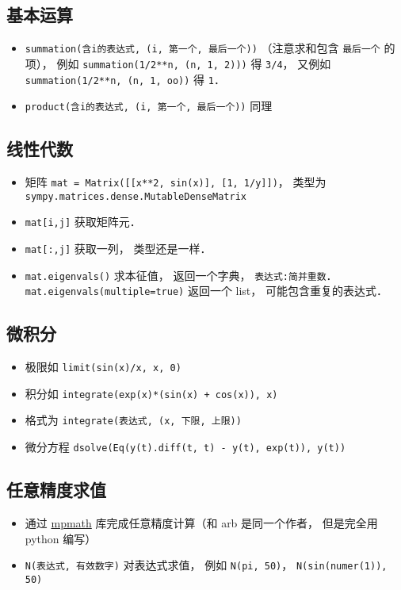 \subsection{基本运算}
\begin{itemize}
\item \verb|summation(含i的表达式, (i, 第一个, 最后一个))| （注意求和包含 \verb|最后一个| 的项）， 例如 \verb|summation(1/2**n, (n, 1, 2)))| 得 \verb|3/4|， 又例如 \verb|summation(1/2**n, (n, 1, oo))| 得 \verb|1|．
\item \verb|product(含i的表达式, (i, 第一个, 最后一个))| 同理
\end{itemize}

\subsection{线性代数}
\begin{itemize}
\item 矩阵 \verb|mat = Matrix([[x**2, sin(x)], [1, 1/y]])|， 类型为 \verb|sympy.matrices.dense.MutableDenseMatrix|
\item \verb|mat[i,j]| 获取矩阵元．
\item \verb|mat[:,j]| 获取一列， 类型还是一样．
\item \verb|mat.eigenvals()| 求本征值， 返回一个字典， \verb|表达式:简并重数|． \verb|mat.eigenvals(multiple=true)| 返回一个 list， 可能包含重复的表达式．
\end{itemize}


\subsection{微积分}
\begin{itemize}
\item 极限如 \verb|limit(sin(x)/x, x, 0)|
\item 积分如 \verb|integrate(exp(x)*(sin(x) + cos(x)), x)|
\item 格式为 \verb|integrate(表达式, (x, 下限, 上限))|
\item 微分方程 \verb|dsolve(Eq(y(t).diff(t, t) - y(t), exp(t)), y(t))|
\end{itemize}


\subsection{任意精度求值}
\begin{itemize}
\item 通过 \href{https://mpmath.org/}{mpmath} 库完成任意精度计算（和 arb 是同一个作者， 但是完全用 python 编写）
\item \verb|N(表达式, 有效数字)| 对表达式求值， 例如 \verb|N(pi, 50)|， \verb|N(sin(numer(1)), 50)|
\end{itemize}

